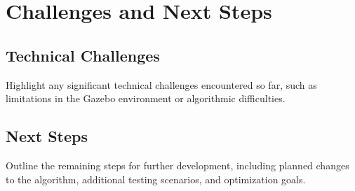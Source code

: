 \chapter{Challenges and Next Steps}

    \section{Technical Challenges}
    Highlight any significant technical challenges encountered so far, such as limitations in the Gazebo environment or algorithmic difficulties.

    \section{Next Steps}
    Outline the remaining steps for further development, including planned changes to the algorithm, additional testing scenarios, and optimization goals.